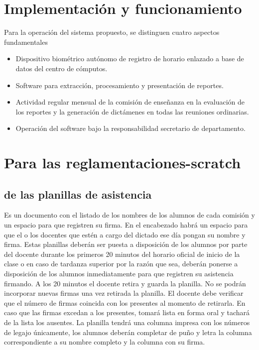 
\section*{Implementación y funcionamiento}
Para la operación del sistema propuesto, se distinguen cuatro aspectos fundamentales
\begin{itemize}
	\item Dispositivo biométrico autónomo de registro de horario enlazado a base de datos del centro de cómputos.
	\item Software para extracción, procesamiento y presentación de reportes.
	\item Actividad regular mensual de la comisión de enseñanza en la evaluación de los reportes y la generación de dictámenes en todas las reuniones ordinarias.
	\item Operación del software bajo la responsabilidad secretario de departamento.
\end{itemize}
\section{Para las reglamentaciones-scratch}
\subsection{de las planillas de asistencia}

Es un documento con el listado de los nombres de los alumnos de cada comisión y un espacio para que registren su firma.
En el encabezado habrá un espacio para que el o los docentes que estén a cargo del dictado ese día pongan su nombre y firma. Estas planillas deberán ser puesta a disposición de los alumnos por parte del docente durante los primeros 20 minutos del horario oficial de inicio de la clase o en caso de tardanza superior por la razón que sea, deberán ponerse a disposición de los alumnos inmediatamente para que registren su asistencia firmando. A los 20 minutos el docente retira y guarda la planilla. No se podrán incorporar nuevas firmas una vez retirada la planilla. El docente debe verificar que el número de firmas coincida con los presentes al momento de retirarla. En caso que las firmas excedan a los presentes, tomará lista en forma oral y tachará de la lista los ausentes. La planilla tendrá una columna impresa con los números de legajo únicamente, los alumnos deberán completar de puño y letra la columna correspondiente a su nombre completo y la columna con su firma.\\
